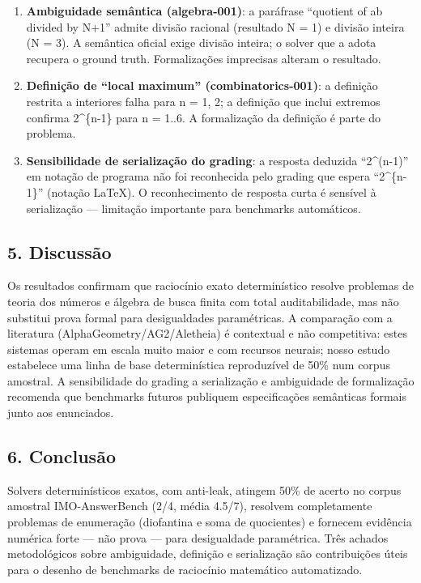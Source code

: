 \documentclass[11pt,a4paper]{article}
\providecommand{\tightlist}{\setlength{\itemsep}{0pt}\setlength{\parskip}{0pt}}
\begin{document}
\begin{enumerate}
\def\labelenumi{\arabic{enumi}.}
\tightlist
\item
  \textbf{Ambiguidade semântica (algebra-001)}: a paráfrase ``quotient
  of ab divided by N+1'' admite divisão racional (resultado N = 1) e
  divisão inteira (N = 3). A semântica oficial exige divisão inteira; o
  solver que a adota recupera o ground truth. Formalizações imprecisas
  alteram o resultado.
\item
  \textbf{Definição de ``local maximum'' (combinatorics-001)}: a
  definição restrita a interiores falha para n = 1, 2; a definição que
  inclui extremos confirma 2\^{}\{n-1\} para n = 1..6. A formalização da
  definição é parte do problema.
\item
  \textbf{Sensibilidade de serialização do grading}: a resposta deduzida
  ``2\^{}(n-1)'' em notação de programa não foi reconhecida pelo grading
  que espera ``2\^{}\{n-1\}'' (notação LaTeX). O reconhecimento de
  resposta curta é sensível à serialização --- limitação importante para
  benchmarks automáticos.
\end{enumerate}

\subsection{5. Discussão}\label{discussuxe3o}

Os resultados confirmam que raciocínio exato determinístico resolve
problemas de teoria dos números e álgebra de busca finita com total
auditabilidade, mas não substitui prova formal para desigualdades
paramétricas. A comparação com a literatura (AlphaGeometry/AG2/Aletheia)
é contextual e não competitiva: estes sistemas operam em escala muito
maior e com recursos neurais; nosso estudo estabelece uma linha de base
determinística reproduzível de 50\% num corpus amostral. A sensibilidade
do grading a serialização e ambiguidade de formalização recomenda que
benchmarks futuros publiquem especificações semânticas formais junto aos
enunciados.

\subsection{6. Conclusão}\label{conclusuxe3o}

Solvers determinísticos exatos, com anti-leak, atingem 50\% de acerto no
corpus amostral IMO-AnswerBench (2/4, média 4.5/7), resolvem
completamente problemas de enumeração (diofantina e soma de quocientes)
e fornecem evidência numérica forte --- não prova --- para desigualdade
paramétrica. Três achados metodológicos sobre ambiguidade, definição e
serialização são contribuições úteis para o desenho de benchmarks de
raciocínio matemático automatizado.
\end{document}
